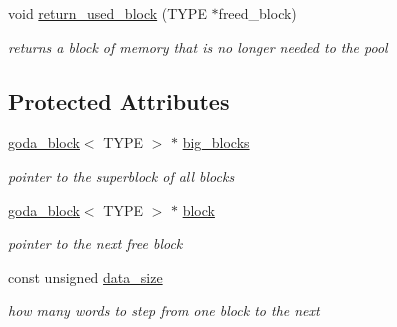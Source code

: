 \begin{DoxyCompactItemize}
\mbox{\label{class_grading___order___data___allocator_a518a8f61da93ea93651f426e12761a07}} 
void \hyperlink{class_grading___order___data___allocator_a518a8f61da93ea93651f426e12761a07}{return\+\_\+used\+\_\+block} (T\+Y\+PE $\ast$freed\+\_\+block)
\begin{DoxyCompactList}\small\item\em returns a block of memory that is no longer needed to the pool \end{DoxyCompactList}\end{DoxyCompactItemize}
\subsection*{Protected Attributes}
\begin{DoxyCompactItemize}
\item 
\mbox{\label{class_grading___order___data___allocator_a4c411227a9a3646010a1f22840094c21}} 
\hyperlink{uniongoda__block}{goda\+\_\+block}$<$ T\+Y\+PE $>$ $\ast$ \hyperlink{class_grading___order___data___allocator_a4c411227a9a3646010a1f22840094c21}{big\+\_\+blocks}
\begin{DoxyCompactList}\small\item\em pointer to the superblock of all blocks \end{DoxyCompactList}\item 
\mbox{\label{class_grading___order___data___allocator_a15e185c6ba2c5262bc03ad13e2dbc223}} 
\hyperlink{uniongoda__block}{goda\+\_\+block}$<$ T\+Y\+PE $>$ $\ast$ \hyperlink{class_grading___order___data___allocator_a15e185c6ba2c5262bc03ad13e2dbc223}{block}
\begin{DoxyCompactList}\small\item\em pointer to the next free block \end{DoxyCompactList}\item 
\mbox{\label{class_grading___order___data___allocator_a7073b652fe474ccd684c1eebd2129a0b}} 
const unsigned \hyperlink{class_grading___order___data___allocator_a7073b652fe474ccd684c1eebd2129a0b}{data\+\_\+size}
\begin{DoxyCompactList}\small\item\em how many words to step from one block to the next \end{DoxyCompactList}\end{DoxyCompactItemize}


